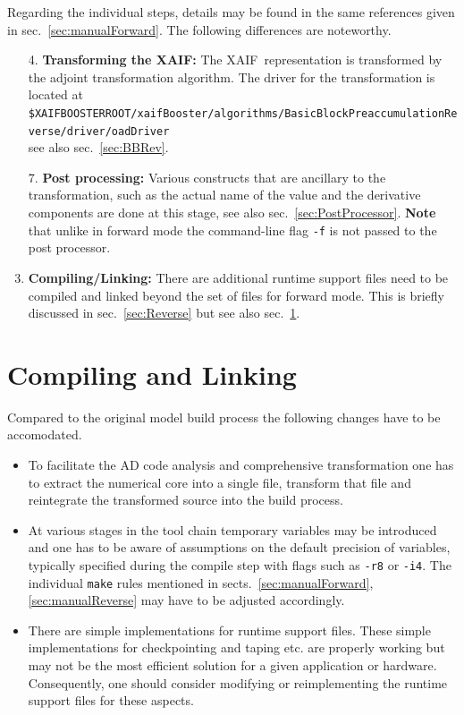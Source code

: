 \documentclass{book}
\newcommand{\xaif}{XAIF}
\newcommand{\refsec}[1]{{sec.~\ref{#1}}}
\newcommand{\refsecs}[2]{{sects.~\ref{#1},\ref{#2}}}
\begin{document}
Regarding the individual steps, details may be found in the same references given in \refsec{sec:manualForward}.
The following differences are noteworthy.
\begin{enumerate}
\item[4.]{\bf Transforming the XAIF:} The \xaif\ representation is transformed by 
the adjoint transformation algorithm. The driver for the transformation is located at\\[1ex] 
\hspace*{.3cm}\lstinline{$XAIFBOOSTERROOT/xaifBooster/algorithms/BasicBlockPreaccumulationReverse/driver/oadDriver} \\[1ex]%
see also \refsec{sec:BBRev}.
\item[7.] {\bf Post processing:} Various constructs that are ancillary to the transformation, 
such as the actual name of the value and the derivative components are done at this stage, 
see also \refsec{sec:PostProcessor}. 
{\bf Note} that unlike in forward mode the command-line flag \lstinline{-f} is not passed to 
the post processor.
\item[8.] {\bf Compiling/Linking:} There are additional runtime support files need to be compiled and linked 
beyond the set of files for forward mode. 
This is briefly discussed in \refsec{sec:Reverse} but see also \refsec{sec:compLink}.
\end{enumerate}

\section{Compiling and Linking}\label{sec:compLink}
Compared to the original model build process the following changes have to be accomodated.
\begin{itemize}
\item To facilitate the AD code analysis and comprehensive transformation 
one has to extract the numerical core into a single file, transform that file and reintegrate 
the transformed source into the build process. 
\item At various stages in the tool chain temporary variables may be introduced and one 
has to be aware of assumptions on the default precision of variables, typically specified during the 
compile step with flags such as \lstinline{-r8} or \lstinline{-i4}. The individual 
\lstinline{make} rules mentioned in \refsecs{sec:manualForward}{sec:manualReverse} 
may have to be adjusted accordingly.
\item There are simple implementations for runtime support files. These simple implementations 
for checkpointing and taping etc. are properly working but may not be the most efficient solution 
for a given application or hardware.  
Consequently, one should consider modifying or reimplementing the runtime support files for 
these aspects.
\end{itemize}
\end{document}
